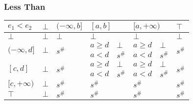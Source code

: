 \documentclass{beamer}
\begin{document}
        \begin{frame}
            \frametitle{Less Than}
    \begin{table}[]
        \begin{tabular}{|l|l|l|ll|ll|l|}
        \hline
        $e_1 < e_2$                     & $\bot$                  & $(-\infty, b]$          & \multicolumn{2}{l|}{$[a, b]$} & \multicolumn{2}{l|}{$[a, +\infty)$} & $\top$                  \\ \hline
        $\bot$                          & $\bot$                  & $\bot$                  & \multicolumn{2}{l|}{$\bot$}   & \multicolumn{2}{l|}{$\bot$}         & $\bot$                  \\ \hline
        \multirow{2}{*}{$(-\infty, d]$} & \multirow{2}{*}{$\bot$} & \multirow{2}{*}{$s^\#$} & $a \ge d$       & $\bot$      & $a \ge d$          & $\bot$         & \multirow{2}{*}{$s^\#$} \\
                                        &                         &                         & $a < d$         & $s^\#$      & $a < d$            & $s^\#$         &                         \\ \hline
        \multirow{2}{*}{$[c, d]$}       & \multirow{2}{*}{$\bot$} & \multirow{2}{*}{$s^\#$} & $a \ge d$       & $\bot$      & $a \ge d$          & $\bot$         & \multirow{2}{*}{$s^\#$} \\
                                        &                         &                         & $a < d$         & $s^\#$      & $a < d$            & $s^\#$         &                         \\ \hline
        $[c, +\infty)$                  & $\bot$                  & $s^\#$                  & \multicolumn{2}{l|}{$s^\#$}   & \multicolumn{2}{l|}{$s^\#$}         & $s^\#$                  \\ \hline
        $\top$                          & $\bot$                  & $s^\#$                  & \multicolumn{2}{l|}{$s^\#$}   & \multicolumn{2}{l|}{$s^\#$}         & $s^\#$                  \\ \hline
        \end{tabular}
        \end{table}
    \end{frame}
    
\end{document}
